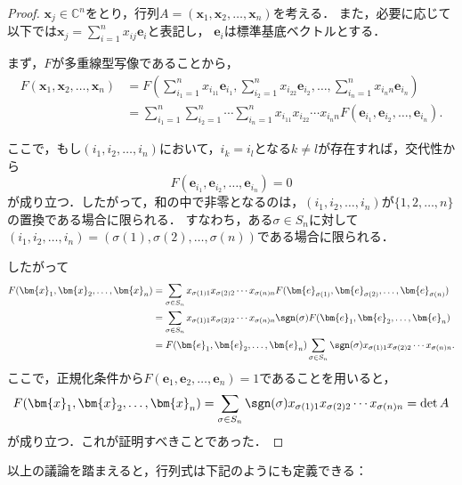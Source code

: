\begin{leftbar}
\begin{proof}
  $\bm{x}_j \in \mathbb{C}^n$をとり，行列$A = (\bm{x}_1, \bm{x}_2, \dots, \bm{x}_n)$を考える．
  また，必要に応じて以下では$\bm{x}_j = \sum_{i=1}^n x_{ij} \bm{e}_i$と表記し，
  $\bm{e}_i$は標準基底ベクトルとする．

  まず，$F$が多重線型写像であることから，
  \begin{align*} 
    F (\bm{x}_1, \bm{x}_2, \dots, \bm{x}_n)& = F \left (\sum_{i_1=1}^n x_{i_11} \bm{e}_{i_1}, \sum_{i_2=1}^n x_{i_22} \bm{e}_{i_2}, \dots, \sum_{i_n=1}^n x_{i_nn} \bm{e}_{i_n} \right) \\
    & = \sum_{i_1=1}^n \sum_{i_2=1}^n \dotsm \sum_{i_n=1}^n x_{i_11} x_{i_22} \dotsm x_{i_nn} F(\bm{e}_{i_1}, \bm{e}_{i_2}, \dots, \bm{e}_{i_n}).
  \end{align*}
  
  ここで，もし$(i_1, i_2, \dots, i_n)$において，$i_k = i_l$となる$k \ne l$が存在すれば，交代性から
  \[
  F(\bm{e}_{i_1}, \bm{e}_{i_2}, \dots, \bm{e}_{i_n}) = 0
  \]
  が成り立つ．したがって，和の中で非零となるのは，$(i_1, i_2, \dots, i_n)$が$\{1, 2, \dots, n\}$の置換である場合に限られる．
  すなわち，ある$\sigma \in S_n$に対して$(i_1, i_2, \dots, i_n) = (\sigma(1), \sigma(2), \dots, \sigma(n))$である場合に限られる．
  
  したがって
  \begin{align*}
    F (\bm{x}_1, \bm{x}_2, \dots, \bm{x}_n)& = \sum_{\sigma \in S_n} x_{\sigma(1)1} x_{\sigma(2)2} \dotsm x_{\sigma(n)n} F(\bm{e}_{\sigma(1)}, \bm{e}_{\sigma(2)}, \dots, \bm{e}_{\sigma(n)}) \\
    & = \sum_{\sigma \in S_n} x_{\sigma(1)1} x_{\sigma(2)2} \dotsm x_{\sigma(n)n} \sgn(\sigma) F(\bm{e}_1, \bm{e}_2, \dots, \bm{e}_n) \\
    & = F(\bm{e}_1, \bm{e}_2, \dots, \bm{e}_n) \sum_{\sigma \in S_n} \sgn(\sigma) x_{\sigma(1)1} x_{\sigma(2)2} \dotsm x_{\sigma(n)n}.
  \end{align*}
  ここで，正規化条件から$F(\bm{e}_1, \bm{e}_2, \dots, \bm{e}_n) = 1$であることを用いると，
  \[
  F (\bm{x}_1, \bm{x}_2, \dots, \bm{x}_n) = \sum_{\sigma \in S_n} \sgn(\sigma) x_{\sigma(1)1} x_{\sigma(2)2} \dotsm x_{\sigma(n)n} = \det A
  \]
  が成り立つ．これが証明すべきことであった．
\end{proof}
\end{leftbar}

以上の議論を踏まえると，行列式は下記のようにも定義できる：

